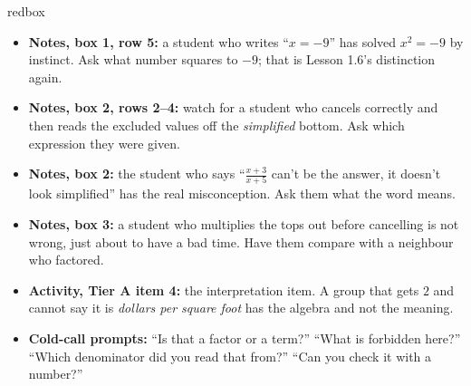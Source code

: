 \documentclass[10pt]{article}
\begin{document}
\begin{skillbox}{redbox}
\begin{itemize}[leftmargin=1.2em, itemsep=2pt, topsep=2pt]
  \item \textbf{Notes, box 1, row 5:} a student who writes ``$x=-9$'' has solved $x^2=-9$ by
        instinct. Ask what number squares to $-9$; that is Lesson 1.6's distinction again.
  \item \textbf{Notes, box 2, rows 2--4:} watch for a student who cancels correctly and then reads
        the excluded values off the \emph{simplified} bottom. Ask which expression they were given.
  \item \textbf{Notes, box 2:} the student who says ``$\tfrac{x+3}{x+5}$ can't be the answer, it
        doesn't look simplified'' has the real misconception. Ask them what the word means.
  \item \textbf{Notes, box 3:} a student who multiplies the tops out before cancelling is not
        wrong, just about to have a bad time. Have them compare with a neighbour who factored.
  \item \textbf{Activity, Tier A item 4:} the interpretation item. A group that gets $2$ and cannot
        say it is \emph{dollars per square foot} has the algebra and not the meaning.
  \item \textbf{Cold-call prompts:} ``Is that a factor or a term?'' ``What is forbidden here?''
        ``Which denominator did you read that from?'' ``Can you check it with a number?''
\end{itemize}
\end{skillbox}
\end{document}
